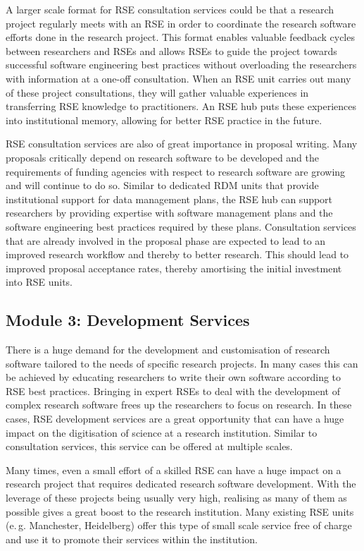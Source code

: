 \documentclass[a4paper]{article}
\makeatletter
\newcommand*{\eg}{e.\,g.\@\xspace}
\makeatother
\begin{document}
A larger scale format for RSE consultation services could be that a research project regularly meets with an RSE in order to coordinate the research software efforts done in the research project.
This format enables valuable feedback cycles between researchers and RSEs and allows RSEs to guide the project
towards successful software engineering best practices without overloading the researchers with information at a one-off consultation.
When an RSE unit carries out many of these project consultations, they will gather valuable experiences in transferring RSE knowledge to practitioners.
An RSE hub puts these experiences into institutional memory, allowing for better RSE practice in the future.

RSE consultation services are also of great importance in proposal writing.
Many proposals critically depend on research software to be developed and the requirements of funding agencies with respect to research software are growing and will continue to do so.
Similar to dedicated RDM units that provide institutional support for data management plans,
the RSE hub can support researchers by providing expertise with software management plans and the software engineering best practices required by these plans.
Consultation services that are already involved in the proposal phase are expected to lead to an improved research workflow and thereby to better research.
This should lead to improved proposal acceptance rates, thereby amortising the initial investment into RSE units.


\subsection{Module 3: Development Services}%
\label{sec:development}

There is a huge demand for the development and customisation of research software tailored to the needs of specific research projects.
In many cases this can be achieved by educating researchers to write their own software according to RSE best practices.
Bringing in expert RSEs to deal with the development of complex research software frees up the researchers to focus on research.
In these cases, RSE development services are a great opportunity that can have a huge impact on the digitisation of science at a research institution.
Similar to consultation services, this service can be offered at multiple scales.

Many times, even a small effort of a skilled RSE can have a huge impact on a research project that requires dedicated research software development.
With the leverage of these projects being usually very high, realising as many of them as possible gives a great boost to the research institution.
Many existing RSE units (\eg{} Manchester, Heidelberg) offer this type of small scale service free of charge and use it to promote their services within the institution.
\end{document}
